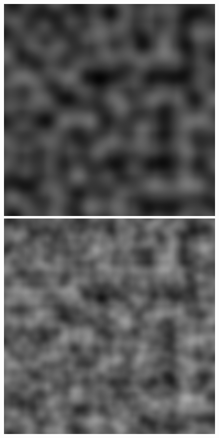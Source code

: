 \documentclass[11pt]{article} %
\begin{document}
\begin{figure}[h]
	\centering
	\includegraphics[scale=.3]{perlin_1_octave}
	\includegraphics[scale=.3]{perlin_2_octaves}

\end{figure}
\end{document}
